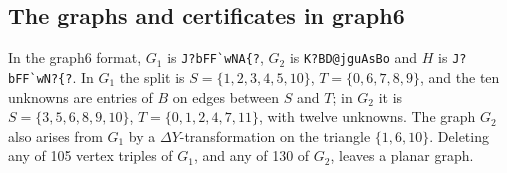 \documentclass[11pt]{article}
\theoremstyle{remark}
\begin{document}
\begin{appendices}
\section{The graphs and certificates in graph6}
In the graph6 format, $G_1$ is \verb|J?bFF`wNA{?|, $G_2$ is
\verb|K?BD@jguAsBo| and $H$ is \verb|J?bFF`wN?{?|. In $G_1$ the split is
$S=\{1,2,3,4,5,10\}$, $T=\{0,6,7,8,9\}$, and the ten unknowns are entries
of $B$ on edges between $S$ and $T$; in $G_2$ it is
$S=\{3,5,6,8,9,10\}$, $T=\{0,1,2,4,7,11\}$, with twelve unknowns. The
graph $G_2$ also arises from $G_1$ by a $\Delta Y$-transformation on the
triangle $\{1,6,10\}$. Deleting any of 105 vertex triples of $G_1$, and
any of 130 of $G_2$, leaves a planar graph.
\end{appendices}
\end{document}
